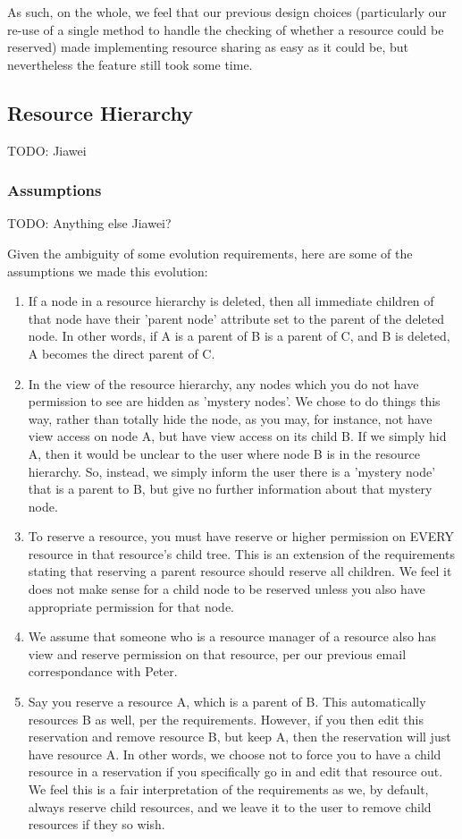 \documentclass[12pt]{article}
\begin{document}
As such, on the whole, we feel that our previous design choices (particularly our re-use of a single method to handle the checking of whether a resource could be reserved) made implementing resource sharing as easy as it could be, but nevertheless the feature still took some time. 

\subsection{Resource Hierarchy}
TODO: Jiawei


\subsubsection{Assumptions}
TODO: Anything else Jiawei? 

Given the ambiguity of some evolution requirements, here are some of the assumptions we made this evolution:
\begin{enumerate}
    \item If a node in a resource hierarchy is deleted, then all immediate children of that node have their 'parent node' attribute set to the parent of the deleted node. In other words, if A is a parent of B is a parent of C, and B is deleted, A becomes the direct parent of C. 
    \item In the view of the resource hierarchy, any nodes which you do not have permission to see are hidden as 'mystery nodes'. We chose to do things this way, rather than totally hide the node, as you may, for instance, not have view access on node A, but have view access on its child B. If we simply hid A, then it would be unclear to the user where node B is in the resource hierarchy. So, instead, we simply inform the user there is a 'mystery node' that is a parent to B, but give no further information about that mystery node. 
    \item To reserve a resource, you must have reserve or higher permission on EVERY resource in that resource's child tree. This is an extension of the requirements stating that reserving a parent resource should reserve all children. We feel it does not make sense for a child node to be reserved unless you also have appropriate permission for that node. 
    \item We assume that someone who is a resource manager of a resource also has view and reserve permission on that resource, per our previous email correspondance with Peter. 
    \item Say you reserve a resource A, which is a parent of B. This automatically resources B as well, per the requirements. However, if you then edit this reservation and remove resource B, but keep A, then the reservation will just have resource A. In other words, we choose not to force you to have a child resource in a reservation if you specifically go in and edit that resource out. We feel this is a fair interpretation of the requirements as we, by default, always reserve child resources, and we leave it to the user to remove child resources if they so wish. 
\end{enumerate}
\end{document}
